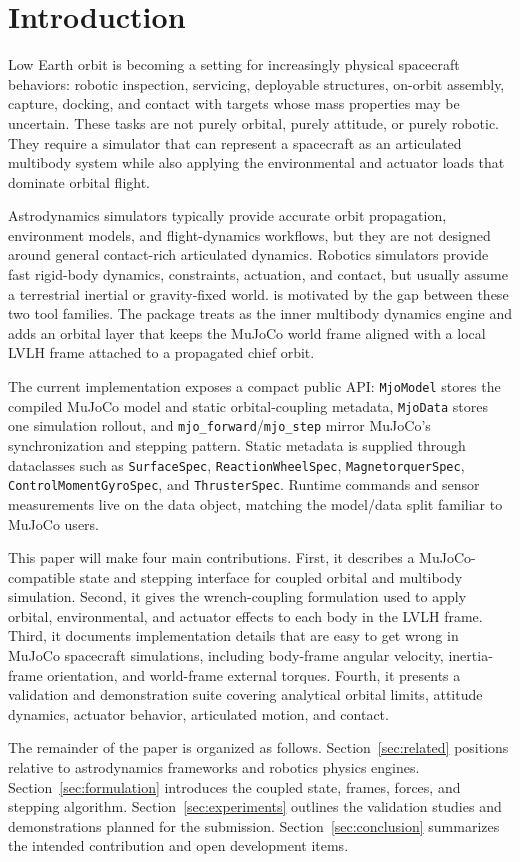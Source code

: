 \section{Introduction}
\label{sec:introduction}

Low Earth orbit is becoming a setting for increasingly physical spacecraft
behaviors: robotic inspection, servicing, deployable structures, on-orbit
assembly, capture, docking, and contact with targets whose mass properties may
be uncertain. These tasks are not purely orbital, purely attitude, or purely
robotic. They require a simulator that can represent a spacecraft as an
articulated multibody system while also applying the environmental and
actuator loads that dominate orbital flight.

Astrodynamics simulators typically provide accurate orbit propagation,
environment models, and flight-dynamics workflows, but they are not designed
around general contact-rich articulated dynamics. Robotics simulators provide
fast rigid-body dynamics, constraints, actuation, and contact, but usually
assume a terrestrial inertial or gravity-fixed world. \mjorbit{} is motivated
by the gap between these two tool families. The package treats \mj{} as the
inner multibody dynamics engine and adds an orbital layer that keeps the
MuJoCo world frame aligned with a local LVLH frame attached to a propagated
chief orbit.

The current implementation exposes a compact public API:
\texttt{MjoModel} stores the compiled MuJoCo model and static orbital-coupling
metadata, \texttt{MjoData} stores one simulation rollout, and
\texttt{mjo\_forward}/\texttt{mjo\_step} mirror MuJoCo's synchronization and
stepping pattern. Static metadata is supplied through dataclasses such as
\texttt{SurfaceSpec}, \texttt{ReactionWheelSpec},
\texttt{MagnetorquerSpec}, \texttt{ControlMomentGyroSpec}, and
\texttt{ThrusterSpec}. Runtime commands and sensor measurements live on the
data object, matching the model/data split familiar to MuJoCo users.

This paper will make four main contributions. First, it describes a
MuJoCo-compatible state and stepping interface for coupled orbital and
multibody simulation. Second, it gives the wrench-coupling formulation used
to apply orbital, environmental, and actuator effects to each body in the
LVLH frame. Third, it documents implementation details that are easy to get
wrong in MuJoCo spacecraft simulations, including body-frame angular velocity,
inertia-frame orientation, and world-frame external torques. Fourth, it
presents a validation and demonstration suite covering analytical orbital
limits, attitude dynamics, actuator behavior, articulated motion, and contact.

The remainder of the paper is organized as follows. Section~\ref{sec:related}
positions \mjorbit{} relative to astrodynamics frameworks and robotics
physics engines. Section~\ref{sec:formulation} introduces the coupled state,
frames, forces, and stepping algorithm. Section~\ref{sec:experiments}
outlines the validation studies and demonstrations planned for the submission.
Section~\ref{sec:conclusion} summarizes the intended contribution and open
development items.

